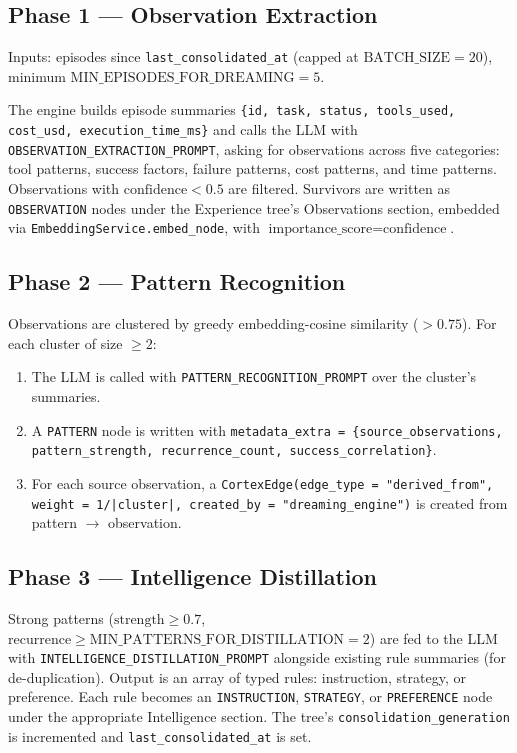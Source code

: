 \documentclass[11pt,a4paper]{article}
\theoremstyle{cortexprop}
\newcommand{\code}[1]{\texttt{#1}}
\begin{document}
\subsection{Phase 1 --- Observation Extraction}

Inputs: episodes since \code{last\_consolidated\_at} (capped at
$\text{BATCH\_SIZE} = 20$), minimum
$\text{MIN\_EPISODES\_FOR\_DREAMING} = 5$.

The engine builds episode summaries
\code{\{id, task, status, tools\_used, cost\_usd, execution\_time\_ms\}}
and calls the LLM with \code{OBSERVATION\_EXTRACTION\_PROMPT}, asking for
observations across five categories: tool patterns, success factors,
failure patterns, cost patterns, and time patterns. Observations with
$\text{confidence} < 0.5$ are filtered. Survivors are written as
\code{OBSERVATION} nodes under the Experience tree's Observations section,
embedded via \code{EmbeddingService.embed\_node}, with
$\text{importance\_score} = \text{confidence}$.

\subsection{Phase 2 --- Pattern Recognition}

Observations are clustered by greedy embedding-cosine similarity
($> 0.75$). For each cluster of size $\geq 2$:

\begin{enumerate}
  \item The LLM is called with \code{PATTERN\_RECOGNITION\_PROMPT} over
  the cluster's summaries.
  \item A \code{PATTERN} node is written with
  \code{metadata\_extra = \{source\_observations, pattern\_strength,
  recurrence\_count, success\_correlation\}}.
  \item For each source observation, a
  \code{CortexEdge(edge\_type = "derived\_from",
  weight = 1/|cluster|,
  created\_by = "dreaming\_engine")} is created from pattern
  $\to$ observation.
\end{enumerate}

\subsection{Phase 3 --- Intelligence Distillation}

Strong patterns ($\text{strength} \geq 0.7$,
$\text{recurrence} \geq \text{MIN\_PATTERNS\_FOR\_DISTILLATION} = 2$)
are fed to the LLM with \code{INTELLIGENCE\_DISTILLATION\_PROMPT}
alongside existing rule summaries (for de-duplication). Output is an
array of typed rules: instruction, strategy, or preference. Each rule
becomes an \code{INSTRUCTION}, \code{STRATEGY}, or \code{PREFERENCE} node
under the appropriate Intelligence section. The tree's
\code{consolidation\_generation} is incremented and
\code{last\_consolidated\_at} is set.
\end{document}
